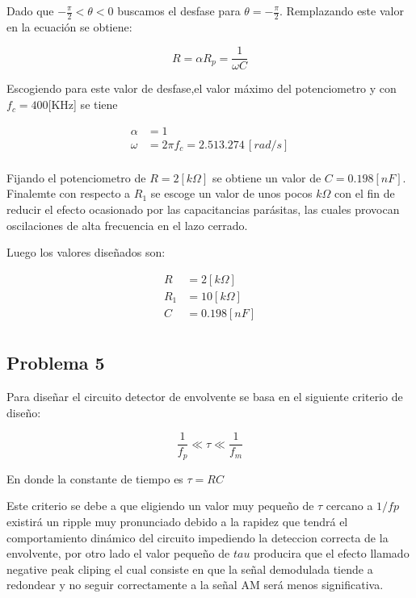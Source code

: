 \documentclass[letterpaper, titlepage]{article}
\begin{document}
		Dado que $- \frac{\pi}{2}< \theta < 0$ 	buscamos el desfase para $\theta =- \frac{\pi}{2}$.
		\newpage
		 Remplazando este valor en la ecuación se obtiene:

		\begin{equation}
			R = \alpha R_{p} = \frac{1}{\omega C}
		\end{equation}

		Escogiendo para este valor de desfase,el valor máximo del potenciometro y con $f_{c}= 400$[KHz] se tiene

		\begin{align*}
			\alpha & = 1 \\
			\omega & = 2 \pi f_{c} = 2.513.274 \,[rad/s] \\
		\end{align*}

		Fijando el potenciometro de $ R=2[k \Omega ] $ se obtiene un valor de $ C = 0.198[nF] $.\\

		Finalemte con respecto a $ R_{1} $ se escoge un valor de unos pocos $ k \Omega $ con el fin de reducir el efecto ocasionado por las capacitancias parásitas, las cuales provocan oscilaciones de alta frecuencia en el lazo cerrado. 

		Luego los valores diseñados son:

		\begin{align*}
			R & = 2[k \Omega] \\
			R_{1} & = 10[k \Omega] \\
			C & = 0.198[nF] \\
		\end{align*}

		\newpage

	\subsection{Problema 5}

		Para diseñar el circuito detector de envolvente se basa en el siguiente criterio de diseño:

		\begin{equation}
			\frac{1}{f_{p}} \ll \tau \ll \frac{1}{f_{m}}
		\end{equation}

		En donde la constante de tiempo es $\tau = RC$

		Este criterio se debe a que eligiendo un valor muy pequeño de $\tau$ cercano a $1/fp$ existirá un ripple muy pronunciado debido a la rapidez que tendrá el comportamiento dinámico del circuito impediendo la deteccion correcta de la envolvente, por otro lado el valor pequeño de $tau$ producira que el efecto llamado negative peak cliping el cual consiste en que la señal demodulada tiende a redondear y no seguir correctamente a la señal AM será menos significativa.
\end{document}
